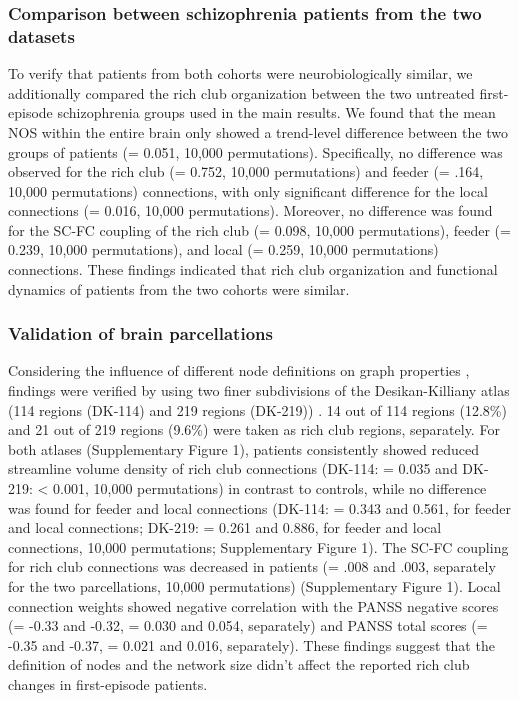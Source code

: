 \begin{refsection}
\subsubsection{Comparison between schizophrenia patients from the two datasets}
To verify that patients from both cohorts were neurobiologically similar, we additionally compared the rich club organization between the two untreated first-episode schizophrenia groups used in the main results. We found that the mean NOS within the entire brain only showed a trend-level difference between the two groups of patients (\pval = 0.051, 10,000 permutations). Specifically, no difference was observed for the rich club (\pval = 0.752, 10,000 permutations) and feeder (\pval = .164, 10,000 permutations) connections, with only significant difference for the local connections (\pval = 0.016, 10,000 permutations). Moreover, no difference was found for the SC-FC coupling of the rich club (\pval = 0.098, 10,000 permutations), feeder (\pval = 0.239, 10,000 permutations), and local (\pval = 0.259, 10,000 permutations) connections. These findings indicated that rich club organization and functional dynamics of patients from the two cohorts were similar.

\subsubsection*{Validation of brain parcellations}
Considering the influence of different node definitions on graph properties \citep{Fornito2010NetworkSE}, findings were verified by using two finer subdivisions of the Desikan-Killiany atlas (114 regions (DK-114) and 219 regions (DK-219)) \citep{CAMMOUN2012386}. 14 out of 114 regions (12.8\%) and 21 out of 219 regions (9.6\%) were taken as rich club regions, separately. For both atlases (Supplementary Figure 1), patients consistently showed reduced streamline volume density of rich club connections (DK-114: \pval = 0.035 and DK-219: \pval < 0.001, 10,000 permutations) in contrast to controls, while no difference was found for feeder and local connections (DK-114: \pval = 0.343 and 0.561, for feeder and local connections; DK-219: \pval = 0.261 and 0.886, for feeder and local connections, 10,000 permutations; Supplementary Figure 1). The SC-FC coupling for rich club connections was decreased in patients (\pval = .008 and .003, separately for the two parcellations, 10,000 permutations) (Supplementary Figure 1). Local connection weights showed negative correlation with the PANSS negative scores (\rval = -0.33 and -0.32, \pval = 0.030 and 0.054, separately) and PANSS total scores (\rval = -0.35 and -0.37, \pval = 0.021 and 0.016, separately). These findings suggest that the definition of nodes and the network size didn’t affect the reported rich club changes in first-episode patients.


\end{refsection}
